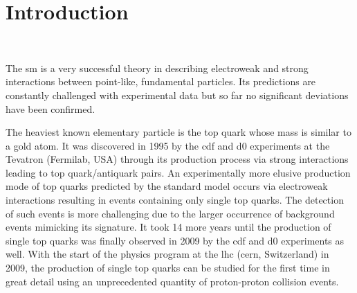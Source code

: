\chapter*{Introduction}


\hfill\parbox[t][0pt][t]{0.46\textwidth}{\vspace{-3cm}
\small{}\\[0.3\baselineskip]
}

The \acrlong{sm} is a very successful theory in describing electroweak and strong interactions between point-like, fundamental particles. Its predictions are constantly challenged with experimental data but so far no significant deviations have been confirmed. 

The heaviest known elementary particle is the top quark whose mass is similar to a gold atom. It was discovered in 1995 by the \gls{cdf} and \gls{d0} experiments at the Tevatron (Fermilab, USA) through its production process via strong interactions leading to top quark/antiquark pairs. An experimentally more elusive production mode of top quarks predicted by the standard model occurs via electroweak interactions resulting in events containing only single top quarks. The detection of such events is more challenging due to the larger occurrence of background events mimicking its signature. It took 14 more years until the production of single top quarks was finally observed in 2009 by the \gls{cdf} and \gls{d0} experiments as well. With the start of the physics program at the \gls{lhc} (\gls{cern}, Switzerland) in 2009, the production of single top quarks can be studied for the first time in great detail using an unprecedented quantity of proton-proton collision events.

